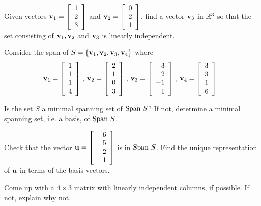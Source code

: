 \item Given vectors $\mathbf{v}_1= \left[ \begin{array}{c} 1 \\ 2\\ 3 \end{array} \right]$ and $\mathbf{v}_2 = \left[ \begin{array}{c} 0 \\ 2\\ 1 \end{array} \right]$, find a vector $\mathbf{v}_3$ in $\mathbb{R}^3$ so that the set consisting of $\mathbf{v}_1, \mathbf{v}_2$ and $\mathbf{v}_3$ is linearly independent.

\item Consider the span of $S=\{\mathbf{v}_1, \mathbf{v}_2, \mathbf{v}_3, \mathbf{v}_4\}$ where
\[ \mathbf{v}_1= \left[ \begin{array}{c} 1\\ 1\\ 1\\ 4 \end{array} \right]\, ,\, \mathbf{v}_2 = \left[ \begin{array}{c} 2\\1\\0\\3 \end{array} \right]\, ,\, \mathbf{v}_3 = \left[ \begin{array}{r} 3\\2\\-1\\1 \end{array} \right]\, ,\, \mathbf{v}_4 = \left[ \begin{array}{c} 3\\3\\1\\6 \end{array} \right]\, .\]
	\ba
	\item  Is the set $S$ a minimal spanning set of $\text{Span} \ S$? If not, determine a minimal spanning set, i.e. a basis, of $\text{Span}\ S$.

	\item Check that the vector $\mathbf{u}=\left[ \begin{array}{r} 6\\5\\-2\\1 \end{array} \right]$ is in $\text{Span} \ S$. Find the unique representation of $\mathbf{u}$ in terms of the basis vectors.

	\ea
	
\item Come up with a $4\times 3$ matrix with linearly independent columns, if possible. If not, explain why not.

